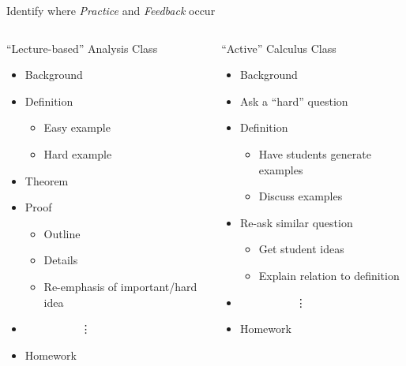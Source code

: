\documentclass[10pt, aspectratio=169, t]{beamer}
\begin{document}
\begin{frame}{Identify where \emph{Practice} and \emph{Feedback} occur}

\begin{columns}
\begin{column}{0.5\textwidth}
	\begin{block}{``Lecture-based'' Analysis Class}
		\begin{itemize}
			\item Background

			\item Definition
				\begin{itemize}
			\item Easy example
			\item Hard example
				\end{itemize}
			\item Theorem
			\item Proof
				\begin{itemize}
			\item Outline
			\item Details
			\item Re-emphasis of important/hard idea
				\end{itemize}
			
			\item[] ~~~~~~~~~~\vdots
			\item Homework
		\end{itemize}
	\end{block}
\end{column}
\begin{column}{0.5\textwidth}  %
	\begin{block}{``Active'' Calculus Class}
		\begin{itemize}
			\item Background
			\item Ask a ``hard'' question
			\item Definition
				\begin{itemize}
			\item Have students generate examples
			\item Discuss examples
				\end{itemize}
			\item Re-ask similar question
				\begin{itemize}
			\item Get student ideas
			\item Explain relation to definition
				\end{itemize}
			\item[] ~~~~~~~~~~\vdots
			\item Homework
		\end{itemize}
	\end{block}
\end{column}
\end{columns}
\end{frame}
\end{document}
